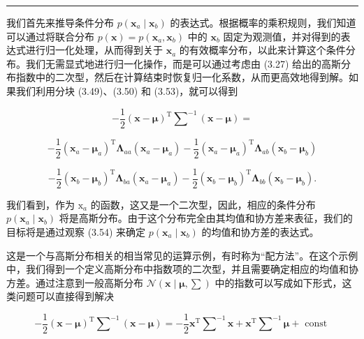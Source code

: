 \documentclass[10pt]{article}
\newcommand{\HRule}{\begin{center}\rule{0.9\linewidth}{0.2mm}\end{center}}
\begin{document}
\HRule

我们首先来推导条件分布 \(p\left( {{\mathbf{x}}_{a} \mid  {\mathbf{x}}_{b}}\right)\) 的表达式。根据概率的乘积规则，我们知道可以通过将联合分布 \(p\left( \mathbf{x}\right)  = p\left( {{\mathbf{x}}_{a},{\mathbf{x}}_{b}}\right)\) 中的 \({\mathbf{x}}_{b}\) 固定为观测值，并对得到的表达式进行归一化处理，从而得到关于 \({\mathbf{x}}_{a}\) 的有效概率分布，以此来计算这个条件分布。我们无需显式地进行归一化操作，而是可以通过考虑由 (3.27) 给出的高斯分布指数中的二次型，然后在计算结束时恢复归一化系数，从而更高效地得到解。如果我们利用分块 (3.49)、(3.50) 和 (3.53)，就可以得到

\[
- \frac{1}{2}{\left( \mathbf{x} - \mathbf{\mu }\right) }^{\mathrm{T}}{\mathbf{\sum }}^{-1}\left( {\mathbf{x} - \mathbf{\mu }}\right)  =
\]

\[
- \frac{1}{2}{\left( {\mathbf{x}}_{a} - {\mathbf{\mu }}_{a}\right) }^{\mathrm{T}}{\mathbf{\Lambda }}_{aa}\left( {{\mathbf{x}}_{a} - {\mathbf{\mu }}_{a}}\right)  - \frac{1}{2}{\left( {\mathbf{x}}_{a} - {\mathbf{\mu }}_{a}\right) }^{\mathrm{T}}{\mathbf{\Lambda }}_{ab}\left( {{\mathbf{x}}_{b} - {\mathbf{\mu }}_{b}}\right)
\]

\[
- \frac{1}{2}{\left( {\mathbf{x}}_{b} - {\mathbf{\mu }}_{b}\right) }^{\mathrm{T}}{\mathbf{\Lambda }}_{ba}\left( {{\mathbf{x}}_{a} - {\mathbf{\mu }}_{a}}\right)  - \frac{1}{2}{\left( {\mathbf{x}}_{b} - {\mathbf{\mu }}_{b}\right) }^{\mathrm{T}}{\mathbf{\Lambda }}_{bb}\left( {{\mathbf{x}}_{b} - {\mathbf{\mu }}_{b}}\right) . \tag{3.54}
\]

我们看到，作为 \({\mathrm{x}}_{a}\) 的函数，这又是一个二次型，因此，相应的条件分布 \(p\left( {{\mathbf{x}}_{a} \mid  {\mathbf{x}}_{b}}\right)\) 将是高斯分布。由于这个分布完全由其均值和协方差来表征，我们的目标将是通过观察 (3.54) 来确定 \(p\left( {{\mathbf{x}}_{a} \mid  {\mathbf{x}}_{b}}\right)\) 的均值和协方差的表达式。

这是一个与高斯分布相关的相当常见的运算示例，有时称为“配方法”。在这个示例中，我们得到一个定义高斯分布中指数项的二次型，并且需要确定相应的均值和协方差。通过注意到一般高斯分布 \(\mathcal{N}\left( {\mathbf{x} \mid  \mathbf{\mu },\mathbf{\sum }}\right)\) 中的指数可以写成如下形式，这类问题可以直接得到解决

\[
- \frac{1}{2}{\left( \mathbf{x} - \mathbf{\mu }\right) }^{\mathrm{T}}{\mathbf{\sum }}^{-1}\left( {\mathbf{x} - \mathbf{\mu }}\right)  =  - \frac{1}{2}{\mathbf{x}}^{\mathrm{T}}{\mathbf{\sum }}^{-1}\mathbf{x} + {\mathbf{x}}^{\mathrm{T}}{\mathbf{\sum }}^{-1}\mathbf{\mu } + \text{ const } \tag{3.55}
\]
\end{document}
